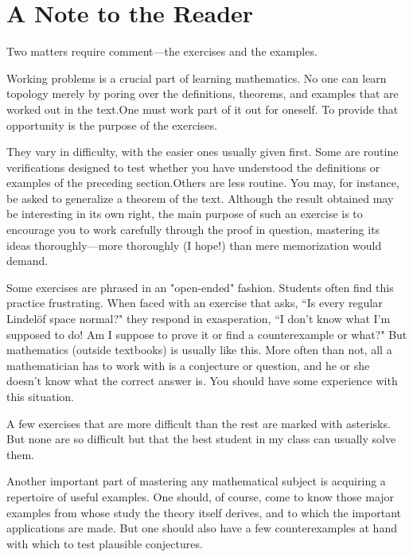 \chapter*{A Note to the Reader}
\vspace{6.5cm}
Two matters require comment---the exercises and the examples.

Working problems is a crucial part of learning mathematics. 
No one can learn topology merely by poring over the definitions, theorems, 
and examples that are worked out in the text.One must work part of it out for 
oneself. To provide that opportunity is the purpose of the exercises.

They vary in difficulty, with the easier ones usually given first. Some are 
routine verifications designed to test whether you have understood the definitions 
or examples of the preceding section.Others are less routine.
You may, for instance, be asked to generalize a theorem of the text. 
Although the result obtained may be interesting in its own right, 
the main purpose of such an exercise is to encourage you to work carefully 
through the proof in question, mastering its ideas thoroughly---more thoroughly 
(I hope!) than mere memorization would demand.

Some exercises are phrased in an "open-ended" fashion. Students often find 
this practice frustrating. When faced with an exercise that asks, 
``Is every regular Lindelöf space normal?" they respond in exasperation, 
``I don't know what I'm supposed to do! Am I suppose to prove it or find a 
counterexample or what?" But mathematics (outside textbooks) is usually like 
this. More often than not, all a mathematician has to work with is a conjecture 
or question, and he or she doesn't know what the correct answer is. 
You should have some experience with this situation.

A few exercises that are more difficult than the rest are marked with asterisks.
But none are so difficult but that the best student in my class can usually solve them.

Another important part of mastering any mathematical subject is acquiring a 
repertoire of useful examples. One should, of course, come to know those major 
examples from whose study the theory itself derives, and to which the important 
applications are made. But one should also have a few counterexamples at hand 
with which to test plausible conjectures.

